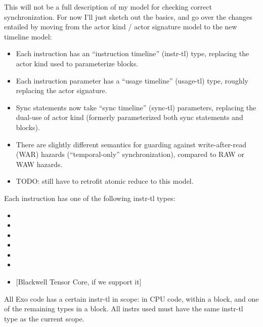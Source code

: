 This will not be a full description of my model for checking correct synchronization.
For now I'll just sketch out the basics, and go over the changes entailed by moving from the actor kind / actor signature model to the new timeline model:
\begin{itemize}
  \item Each instruction has an ``instruction timeline'' (instr-tl) type, replacing the actor kind used to parameterize  blocks.
  \filbreak
  \item Each instruction parameter has a ``usage timeline'' (usage-tl) type, roughly replacing the actor signature.
  \filbreak
  \item Sync statements now take ``sync timeline'' (sync-tl) parameters, replacing the dual-use of actor kind (formerly parameterized both sync statements and  blocks).
  \filbreak
  \item There are slightly different semantics for guarding against write-after-read (WAR) hazards (``temporal-only'' synchronization), compared to RAW or WAW hazards.
  \filbreak
  \item TODO: still have to retrofit atomic reduce to this model.
\end{itemize}

\filbreak
{}

Each instruction has one of the following instr-tl types:

\begin{itemize}
  \item {}
  \filbreak
  \item {}
  \filbreak
  \item {}
  \filbreak
  \item {}
  \filbreak
  \item {}
  \filbreak
  \item {}
  \filbreak
  \item {}  [Blackwell Tensor Core, if we support it]
\end{itemize}
\filbreak
All Exo code has a certain instr-tl in scope:  in CPU code,  within a  block, and one of the remaining types in a  block.
All instrs used must have the same instr-tl type as the current scope.

